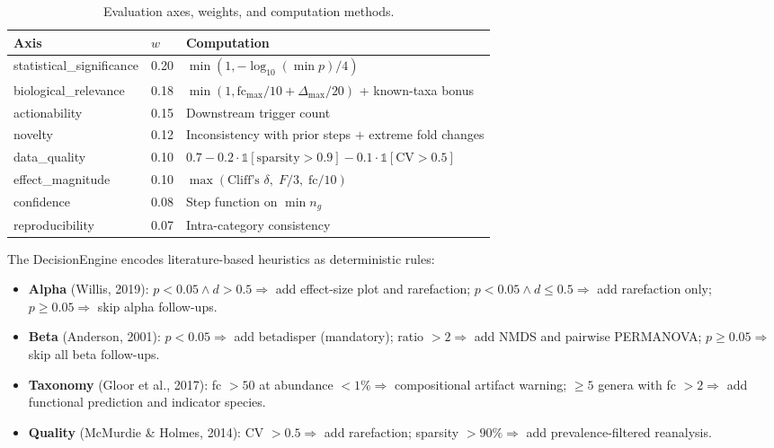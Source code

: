 \documentclass[11pt,a4paper]{article}
\begin{document}
\begin{table}[t]
\centering
\caption{Evaluation axes, weights, and computation methods.}
\label{tab:axes}
\small
\begin{tabular}{@{}llp{7.5cm}@{}}
\toprule
\textbf{Axis} & \textbf{$w$} & \textbf{Computation} \\
\midrule
statistical\_significance & 0.20 &
  $\min(1, -\log_{10}(\min p) / 4)$ \\
biological\_relevance & 0.18 &
  $\min(1, \mathrm{fc}_{\max}/10 + \Delta_{\max}/20)$ + known-taxa bonus \\
actionability & 0.15 &
  Downstream trigger count \\
novelty & 0.12 &
  Inconsistency with prior steps $+$ extreme fold changes \\
data\_quality & 0.10 &
  $0.7 - 0.2 \cdot \mathbb{1}[\text{sparsity} > 0.9]
        - 0.1 \cdot \mathbb{1}[\text{CV} > 0.5]$ \\
effect\_magnitude & 0.10 &
  $\max(\text{Cliff's } \delta,\; F/3,\; \mathrm{fc}/10)$ \\
confidence & 0.08 &
  Step function on $\min n_g$ \\
reproducibility & 0.07 &
  Intra-category consistency \\
\bottomrule
\end{tabular}
\end{table}

The DecisionEngine encodes literature-based heuristics as
deterministic rules:
\begin{itemize}
  \item \textbf{Alpha} (Willis, 2019):
    $p < 0.05 \land d > 0.5 \Rightarrow$ add effect-size plot
    and rarefaction;
    $p < 0.05 \land d \leq 0.5 \Rightarrow$ add rarefaction only;
    $p \geq 0.05 \Rightarrow$ skip alpha follow-ups.
  \item \textbf{Beta} (Anderson, 2001):
    $p < 0.05 \Rightarrow$ add betadisper (mandatory);
    ratio $> 2 \Rightarrow$ add NMDS and pairwise PERMANOVA;
    $p \geq 0.05 \Rightarrow$ skip all beta follow-ups.
  \item \textbf{Taxonomy} (Gloor et al., 2017):
    fc $> 50$ at abundance $< 1\% \Rightarrow$ compositional
    artifact warning;
    $\geq 5$ genera with fc $> 2 \Rightarrow$ add functional
    prediction and indicator species.
  \item \textbf{Quality} (McMurdie \& Holmes, 2014):
    CV $> 0.5 \Rightarrow$ add rarefaction;
    sparsity $> 90\% \Rightarrow$ add prevalence-filtered reanalysis.
\end{itemize}
\end{document}

